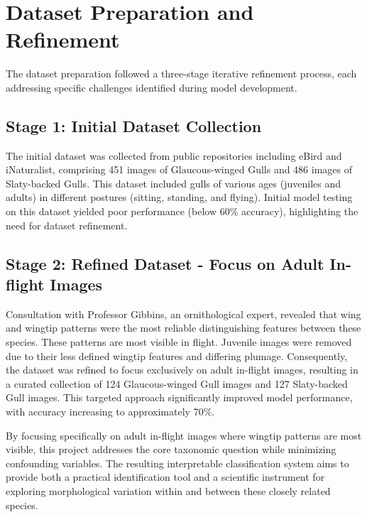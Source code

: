 \documentclass[a4paper,12pt]{report}
\begin{document}
\section{Dataset Preparation and Refinement}

The dataset preparation followed a three-stage iterative refinement process, each addressing specific challenges identified during model development.

\subsection{Stage 1: Initial Dataset Collection}

The initial dataset was collected from public repositories including eBird and iNaturalist, comprising 451 images of Glaucous-winged Gulls and 486 images of Slaty-backed Gulls. This dataset included gulls of various ages (juveniles and adults) in different postures (sitting, standing, and flying). Initial model testing on this dataset yielded poor performance (below 60\% accuracy), highlighting the need for dataset refinement. 


\subsection{Stage 2: Refined Dataset - Focus on Adult In-flight Images}

Consultation with Professor Gibbins, an ornithological expert, revealed that wing and wingtip patterns were the most reliable distinguishing features between these species. These patterns are most visible in flight. Juvenile images were removed due to their less defined wingtip features and differing plumage. Consequently, the dataset was refined to focus exclusively on adult in-flight images, resulting in a curated collection of 124 Glaucous-winged Gull images and 127 Slaty-backed Gull images. This targeted approach significantly improved model performance, with accuracy increasing to approximately 70\%.

By focusing specifically on adult in-flight images where wingtip patterns are most visible, this project addresses the core taxonomic question while minimizing confounding variables. The resulting interpretable classification system aims to provide both a practical identification tool and a scientific instrument for exploring morphological variation within and between these closely related species.
\end{document}
